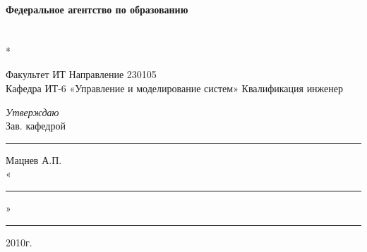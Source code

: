 
\begin{center}
\textbf{Федеральное агентство по образованию} \\
\vspace{0.5cm}
\\
\\*
\end{center}

\begin{center}
Факультет ИТ  Направление 230105 \\
Кафедра ИТ-6 «Управление и моделирование систем» Квалификация инженер \\
\end{center}

\begin{flushright}
\textit{Утверждаю} \\
Зав. кафедрой \\
\rule{2.9cm}{0.5pt} Мацнев А.П. \\
«\rule{1cm}{0.5pt}»\rule{3cm}{0.5pt} 2010г.
\end{flushright}

